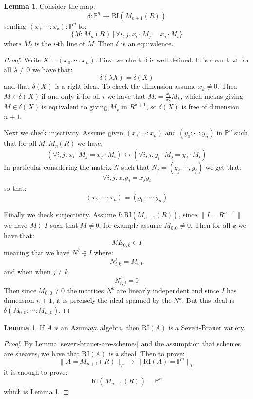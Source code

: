 \documentclass[10pt,a4paper]{article}
\theoremstyle{definition}
\newtheorem{lemma}[theorem]{Lemma}
\newcommand{\RI}{\mathrm{RI}}
\newcommand{\propTrunc}[1]{\lVert #1 \rVert}
\newcommand{\bP}{\mathbb{P}}
\begin{document}
\begin{lemma}\label{right-ideal-of-matrices-are-projective}
Consider the map:
\[\delta:\bP^n \to \RI(M_{n+1}(R))\]
sending $(x_0:\cdots:x_n):\bP^n$ to:
\[\{M:M_n(R)\ |\ \forall i,j.\ x_i\cdot M_j = x_j\cdot M_i\}\]
where $M_i$ is the $i$-th line of $M$. Then $\delta$ is an equivalence.
\end{lemma}

\begin{proof}
Write $X=(x_0:\cdots:x_n)$. First we check $\delta$ is well defined. It is clear that for all $\lambda\not=0$ we have that:
\[\delta(\lambda X) = \delta(X)\]
and that $\delta(X)$ is a right ideal. To check the dimension assume $x_k\not=0$. Then $M\in\delta(X)$ if and only if for all $i$ we have that $M_i = \frac{x_i}{x_k} M_k$, which means giving $M\in\delta(X)$ is equivalent to giving $M_k$ in $R^{n+1}$, so $\delta(X)$ is free of dimension $n+1$.

Next we check injectivity. Assume given $(x_0:\cdots:x_n)$ and $(y_0:\cdots:y_n)$ in $\bP^n$ such that for all $M:M_n(R)$ we have:
\[(\forall i,j.\ x_i\cdot M_j = x_j\cdot M_i) \leftrightarrow (\forall i,j.\ y_i\cdot M_j = y_j\cdot M_i)\]
In particular considering the matrix $N$ such that $N_j = (y_j,\cdots,y_j)$ we get that:
\[\forall i,j.\ x_iy_j=x_jy_i\] 
so that:
\[(x_0:\cdots:x_n) = (y_0:\cdots:y_n)\]

Finally we check surjectivity. Assume $I:\RI(M_{n+1}(R))$, since $\propTrunc{I=R^{n+1}}$ we have $M\in I$ such that $M\not=0$, for example assume $M_{0,0}\not=0$. Then for all $k$ we have that:
\[ME_{0,k}\in I\]
meaning that we have $N^k\in I$ where:
\[N^k_{i,k} = M_{i,0}\]
and when when $j\not=k$
\[N^k_{i,j} = 0\]
Then since $M_{0,0}\not=0$ the matrices $N^k$ are linearly independent and since $I$ has dimension $n+1$, it is precisely the ideal spanned by the $N^k$. But this ideal is $\delta(M_{0,0}:\cdots:M_{n,0})$.
\end{proof}

\begin{lemma}
If $A$ is an Azumaya algebra, then $\RI(A)$ is a Severi-Brauer variety.
\end{lemma}

\begin{proof}
By Lemma \ref{severi-brauer-are-schemes} and the assumption that schemes are sheaves, we have that $\RI(A)$ is a sheaf. Then to prove:
\[\propTrunc{A=M_{n+1}(R)}_T \to \propTrunc{\RI(A)=\bP^n}_T\]
it is enough to prove:
\[\RI(M_{n+1}(R)) = \bP^n\]
which is Lemma \ref{right-ideal-of-matrices-are-projective}.
\end{proof}
\end{document}
